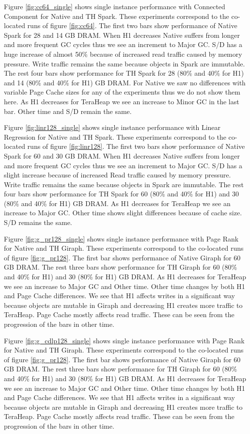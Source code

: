 Figure \ref{fig:cc64_single} shows single instance performance with Connected Component for Native and TH Spark. These experiments correspond to the co-located runs of figure \ref{fig:cc64}. The first two bars show performance of Native Spark for 28 and 14 GB DRAM. When H1 decreases Native suffers from longer and more frequent GC cycles thus we see an increment to Major GC. S/D has a huge increase of almost 50\% because of increased read traffic caused by memory pressure. Write traffic remains the same because objects in Spark are immutable. The rest four bars show performance for TH Spark for 28 (80\% and 40\% for H1) and 14 (80\% and 40\% for H1) GB DRAM. For Native we saw no differences with variable Page Cache sizes for any of the experiments thus we do not show them here. As H1 decreases for TeraHeap we see an increase to Minor GC in the last bar. Other time and S/D remain the same.

Figure \ref{fig:linr128_single} shows single instance performance with Linear Regression for Native and TH Spark. These experiments correspond to the co-located runs of figure \ref{fig:linr128}. The first two bars show performance of Native Spark for 60 and 30 GB DRAM. When H1 decreases Native suffers from longer and more frequent GC cycles thus we see an increment to Major GC. S/D has a slight increase because of increased Read traffic caused by memory pressure. Write traffic remains the same because objects in Spark are immutable. The rest four bars show performance for TH Spark for 60 (80\% and 40\% for H1) and 30 (80\% and 40\% for H1) GB DRAM. As H1 decreases for TeraHeap we see an increase to Major GC. Other time shows slight differences because of cache size. S/D remains the same.

Figure \ref{fig:g_pr128_single} shows single instance performance with Page Rank for Native and TH Giraph. These experiments correspond to the co-located runs of figure \ref{fig:g_pr128}. The first bar shows performance of Native Giraph for 60 GB DRAM. The rest three bars show performance for TH Giraph for 60 (80\% and 40\% for H1) and 30 (80\% for H1) GB DRAM. As H1 decreases for TeraHeap we see an increase to Major GC  and Other time. Other time changes by both H1 and Page Cache differences. We see that H1 affects writes in a significant way because objects are mutable in Giraph and decreasing H1 creates more traffic to TeraHeap. Page Cache mostly affects read traffic. These can be seen from the progression of the bars in other time.

Figure \ref{fig:g_cdlp128_single} shows single instance performance with Page Rank for Native and TH Giraph. These experiments correspond to the co-located runs of figure \ref{fig:g_pr128}. The first bar shows performance of Native Giraph for 60 GB DRAM. The rest three bars show performance for TH Giraph for 60 (80\% and 40\% for H1) and 30 (80\% for H1) GB DRAM. As H1 decreases for TeraHeap we see an increase to Major GC  and Other time. Other time changes by both H1 and Page Cache differences. We see that H1 affects writes in a significant way because objects are mutable in Giraph and decreasing H1 creates more traffic to TeraHeap. Page Cache mostly affects read traffic. These can be seen from the progression of the bars in other time.

